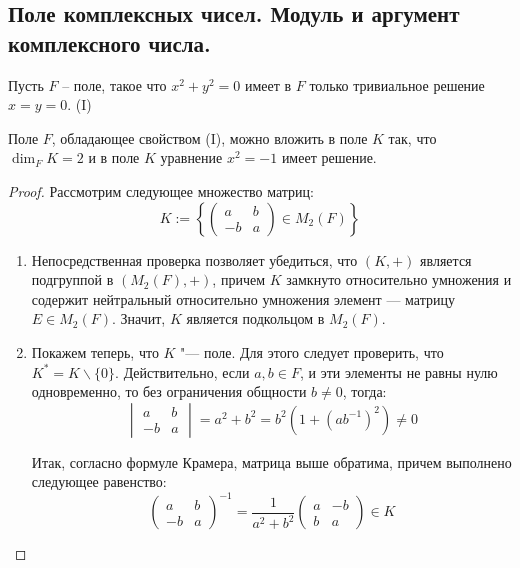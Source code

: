 \subsection{Поле комплексных чисел. Модуль и аргумент комплексного числа.}

        Пусть $F$ -- поле, такое что $x^2 + y^2 = 0$ имеет в $F$ только тривиальное решение $x = y = 0$. (I)
    
    \begin{proposition}
            Поле $F$, обладающее свойством (I), можно вложить в поле $K$ так, что $\dim_{F}K = 2$ и в поле $K$ уравнение $x^2 = -1$ имеет решение.
    \end{proposition}
    
    \begin{proof}
            Рассмотрим следующее множество матриц:
    	\[K := \left\{\begin{pmatrix}
    	a & b\\
    	-b & a
    	\end{pmatrix} \in M_2(F)\right\}\]
        \begin{enumerate}
    		\item Непосредственная проверка позволяет убедиться, что $(K, +)$ является подгруппой в $(M_2(F), +)$, причем $K$ замкнуто относительно умножения и содержит нейтральный относительно умножения элемент --- матрицу $E \in M_2(F)$. Значит, $K$ является подкольцом в $M_2(F)$.
    		
    		\item Покажем теперь, что $K$ "--- поле. Для этого следует проверить, что $K^* = K \backslash \{0\}$. Действительно, если $a, b \in F$, и эти элементы не равны нулю одновременно, то без ограничения общности $b \ne 0$, тогда:
    		\[\begin{vmatrix}
    		a & b\\
    		-b & a
    		\end{vmatrix} = a^{2} + b^{2} = b^2(1 + (ab^{-1})^2) \ne 0\]
    		
    		Итак, согласно формуле Крамера, матрица выше обратима, причем выполнено следующее равенство:
    		\[\begin{pmatrix}
    		a & b\\
    		-b & a
    		\end{pmatrix}^{-1} = \frac{1}{a^2 + b^2}\begin{pmatrix}
    		a & -b\\
    		b & a
    		\end{pmatrix} \in K\]
    		

\end{enumerate}
\end{proof}
